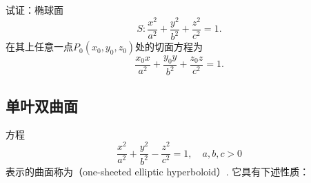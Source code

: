 \begin{example}
试证：椭球面\begin{equation*}
S: \frac{x^2}{a^2} + \frac{y^2}{b^2} + \frac{z^2}{c^2} = 1.
\end{equation*}在其上任意一点\(P_0(x_0,y_0,z_0)\)处的切面方程为
\begin{equation}\label{equation:解析几何.椭球面的切平面}
	\frac{x_0 x}{a^2} + \frac{y_0 y}{b^2} + \frac{z_0 z}{c^2} = 1.
\end{equation}
\end{example}

\subsection{单叶双曲面}
方程\begin{equation}\label{equation:解析几何.单叶双曲面}
	\frac{x^2}{a^2}+\frac{y^2}{b^2}-\frac{z^2}{c^2}=1,
	\quad a,b,c>0
\end{equation}
表示的曲面称为（one-sheeted elliptic hyperboloid）.
它具有下述性质：
